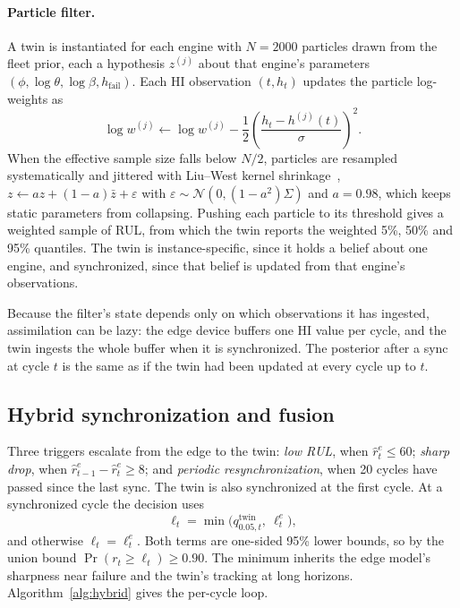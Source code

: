 \documentclass[pdflatex,sn-mathphys-num]{sn-jnl}
\begin{document}
\paragraph{Particle filter.} A twin is instantiated for each engine with $N = 2000$ particles drawn from the fleet prior, each a hypothesis $z^{(j)}$ about that engine's parameters $(\phi, \log\theta, \log\beta, h_{\mathrm{fail}})$. Each HI observation $(t, h_t)$ updates the particle log-weights as
\begin{equation}
\log w^{(j)} \leftarrow \log w^{(j)} - \frac{1}{2}\left(\frac{h_t - h^{(j)}(t)}{\sigma}\right)^{2}.
\end{equation}
When the effective sample size falls below $N/2$, particles are resampled systematically and jittered with Liu--West kernel shrinkage~\cite{liu2001combined}, $z \leftarrow a z + (1-a)\bar z + \varepsilon$ with $\varepsilon \sim \mathcal{N}(0, (1-a^2)\Sigma)$ and $a = 0.98$, which keeps static parameters from collapsing. Pushing each particle to its threshold gives a weighted sample of RUL, from which the twin reports the weighted 5\%, 50\% and 95\% quantiles. The twin is instance-specific, since it holds a belief about one engine, and synchronized, since that belief is updated from that engine's observations.

Because the filter's state depends only on which observations it has ingested, assimilation can be lazy: the edge device buffers one HI value per cycle, and the twin ingests the whole buffer when it is synchronized. The posterior after a sync at cycle $t$ is the same as if the twin had been updated at every cycle up to $t$.

\subsection{Hybrid synchronization and fusion}\label{sec:hybrid}
Three triggers escalate from the edge to the twin: \emph{low RUL}, when $\hat r^{e}_t \le 60$; \emph{sharp drop}, when $\hat r^{e}_{t-1} - \hat r^{e}_t \ge 8$; and \emph{periodic resynchronization}, when 20 cycles have passed since the last sync. The twin is also synchronized at the first cycle. At a synchronized cycle the decision uses
\begin{equation}
\ell_t = \min\big(q^{\mathrm{twin}}_{0.05,t},\ \ell^{e}_t\big),
\end{equation}
and otherwise $\ell_t = \ell^{e}_t$. Both terms are one-sided 95\% lower bounds, so by the union bound $\Pr(r_t \ge \ell_t) \ge 0.90$. The minimum inherits the edge model's sharpness near failure and the twin's tracking at long horizons. Algorithm~\ref{alg:hybrid} gives the per-cycle loop.
\end{document}
